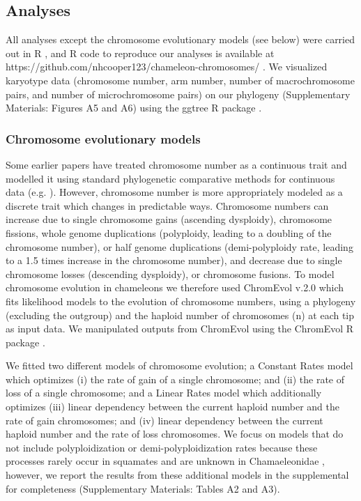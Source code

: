 \documentclass[a4paper, 12pt]{article}
\begin{document}
\subsection{Analyses}
All analyses except the chromosome evolutionary models (see below) were carried out in R \citep{R}, and R code to reproduce our analyses is available at https://github.com/nhcooper123/chameleon-chromosomes/ \citep{coopercode2022}. 
We visualized karyotype data (chromosome number, arm number, number of macrochromosome pairs, and number of microchromosome pairs) on our phylogeny (Supplementary Materials: Figures A5 and A6) using the ggtree R package \citep{yu2017ggtree}.

\subsubsection{Chromosome evolutionary models}
Some earlier papers have treated chromosome number as a continuous trait and modelled it using standard phylogenetic comparative methods for continuous data (e.g. \citealt{vershinina2017evolutionary}). 
However, chromosome number is more appropriately modeled as a discrete trait which changes in predictable ways. 
Chromosome numbers can increase due to single chromosome gains (ascending dysploidy), chromosome fissions, whole genome duplications (polyploidy, leading to a doubling of the chromosome number), or half genome duplications (demi-polyploidy rate, leading to a 1.5 times increase in the chromosome number), and decrease due to single chromosome losses (descending dysploidy), or chromosome fusions. 
To model chromosome evolution in chameleons we therefore used ChromEvol v.2.0 \citep{glick2014chromevol,mayrose2010probabilistic} which fits likelihood models to the evolution of chromosome numbers, using a phylogeny (excluding the outgroup) and the haploid number of chromosomes (n) at each tip as input data. 
We manipulated outputs from ChromEvol using the ChromEvol R package \citep{chromevol}.

We fitted two different models of chromosome evolution; a Constant Rates model which optimizes (i) the rate of gain of a single chromosome; and (ii) the rate of loss of a single chromosome; and a Linear Rates model which additionally optimizes (iii) linear dependency between the current haploid number and the rate of gain chromosomes; and (iv) linear dependency between the current haploid number and the rate of loss chromosomes. 
We focus on models that do not include polyploidization or demi-polyploidization rates because these processes rarely occur in squamates and are unknown in Chamaeleonidae \citep{bogart1980evolutionary,mezzasalma2021lizards}, however, we report the results from these additional models in the supplemental for completeness (Supplementary Materials: Tables A2 and A3). 
\end{document}

